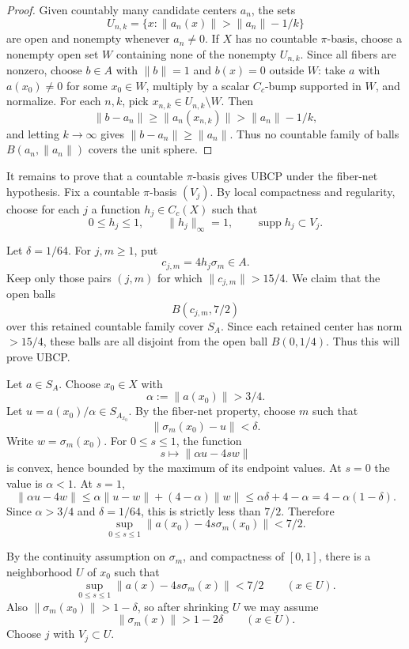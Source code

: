 \documentclass[11pt]{article}
\newcommand{\supp}{\operatorname{supp}}
\begin{document}
\begin{proof}
Given countably many candidate centers \(a_n\), the sets
\[
        U_{n,k}=\{x:\|a_n(x)\|>\|a_n\|-1/k\}
\]
are open and nonempty whenever \(a_n\ne0\).  If \(X\) has no countable
\(\pi\)-basis, choose a nonempty open set \(W\) containing none of the nonempty
\(U_{n,k}\).  Since all fibers are nonzero, choose \(b\in A\) with
\(\|b\|=1\) and \(b(x)=0\) outside \(W\): take \(a\) with \(a(x_0)\ne0\) for
some \(x_0\in W\), multiply by a scalar \(C_c\)-bump supported in \(W\), and
normalize.  For each \(n,k\), pick \(x_{n,k}\in U_{n,k}\setminus W\).  Then
\[
        \|b-a_n\|\ge \|a_n(x_{n,k})\|>\|a_n\|-1/k,
\]
and letting \(k\to\infty\) gives \(\|b-a_n\|\ge\|a_n\|\).  Thus no countable
family of balls \(B(a_n,\|a_n\|)\) covers the unit sphere.
\end{proof}

It remains to prove that a countable \(\pi\)-basis gives UBCP under the
fiber-net hypothesis.  Fix a countable \(\pi\)-basis \((V_j)\).  By local
compactness and regularity, choose for each \(j\) a function \(h_j\in C_c(X)\)
such that
\[
        0\le h_j\le1,\qquad \|h_j\|_\infty=1,\qquad \supp h_j\subset V_j.
\]

Let \(\delta=1/64\).  For \(j,m\ge1\), put
\[
        c_{j,m}=4h_j\sigma_m\in A.
\]
Keep only those pairs \((j,m)\) for which \(\|c_{j,m}\|>15/4\).  We claim that
the open balls
\[
        B(c_{j,m},7/2)
\]
over this retained countable family cover \(S_A\).  Since each retained center
has norm \(>15/4\), these balls are all disjoint from the open ball
\(B(0,1/4)\).  Thus this will prove UBCP.

Let \(a\in S_A\).  Choose \(x_0\in X\) with
\[
        \alpha:=\|a(x_0)\|>3/4.
\]
Let \(u=a(x_0)/\alpha\in S_{A_{x_0}}\).  By the fiber-net property, choose
\(m\) such that
\[
        \|\sigma_m(x_0)-u\|<\delta.
\]
Write \(w=\sigma_m(x_0)\).  For \(0\le s\le1\), the function
\[
        s\mapsto \|\alpha u-4s w\|
\]
is convex, hence bounded by the maximum of its endpoint values.  At \(s=0\)
the value is \(\alpha<1\).  At \(s=1\),
\[
        \|\alpha u-4w\|
        \le
        \alpha\|u-w\|+(4-\alpha)\|w\|
        \le
        \alpha\delta+4-\alpha
        =
        4-\alpha(1-\delta).
\]
Since \(\alpha>3/4\) and \(\delta=1/64\), this is strictly less than \(7/2\).
Therefore
\[
        \sup_{0\le s\le1}\|a(x_0)-4s\sigma_m(x_0)\|<7/2.
\]

By the continuity assumption on \(\sigma_m\), and compactness of \([0,1]\),
there is a neighborhood \(U\) of \(x_0\) such that
\[
        \sup_{0\le s\le1}\|a(x)-4s\sigma_m(x)\|<7/2
        \qquad (x\in U).
\]
Also \(\|\sigma_m(x_0)\|>1-\delta\), so after shrinking \(U\) we may assume
\[
        \|\sigma_m(x)\|>1-2\delta
        \qquad (x\in U).
\]
Choose \(j\) with \(V_j\subset U\).
\end{document}
